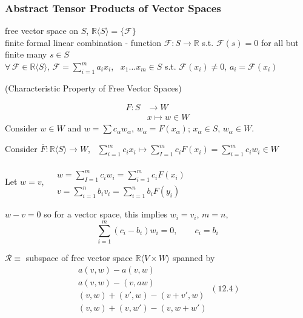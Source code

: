 \subsubsection*{ Abstract Tensor Products of Vector Spaces }



free vector space on $S$, $\mathbb{R}\langle S \rangle = \lbrace \mathcal{F} \rbrace$ \\
\quad \quad finite formal linear combination - function $\mathcal{F} : S \to \mathbb{R}$ s.t. $\mathcal{F}(s) = 0$ for all but finite many $s \in S$ \\
\quad \quad $\forall \, \mathcal{F} \in \mathbb{R} \langle S \rangle$, $\mathcal{F} = \sum_{i=1}^m a_i x_i$, \, $x_1 \dots x_m \in S$ s.t. $\mathcal{F}(x_i) \neq 0$, $a_i = \mathcal{F}(x_i)$

 (Characteristic Property of Free Vector Spaces)

\[
\begin{aligned}
  F : S & \to W \\ 
  & x \mapsto w \in W 
\end{aligned}
\]
Consider $w\in W$ and $w = \sum c_{\alpha} w_{\alpha}$, $w_{\alpha} = F(x_{\alpha})$; $x_{\alpha} \in S$, $w_{\alpha} \in W$.  

Consider $\overline{F}:\mathbb{R}\langle S \rangle \to W$, \, $\sum_{i=1}^m c_i x_i \mapsto \sum_{I=1}^m c_i F(x_i) = \sum_{i=1}^m c_i w_i \in W$

Let $w= v$, $\begin{aligned} & \quad \\ & w = \sum_{I=1}^m c_i w_i = \sum_{i=1}^m c_i F(x_i) \\ & v = \sum_{i=1}^n b_i v_i = \sum_{i=1}^n b_i F(y_i) \end{aligned}$

$w - v =0$ so for a vector space, this implies $w_i = v_i$, $m=n$, 
\[
\sum_{i=1}^m (c_i-b_i)w_i = 0, \quad \quad c_i = b_i
\]

$\mathcal{R} \equiv$ subspace of free vector space $\mathbb{R}\langle V \times W \rangle $ spanned by 
\begin{equation}
\begin{gathered}
  a(v,w) - a(v, w) \\
  a(v,w) - (v,aw) \\
(v,w) + (v',w) - (v+v',w) \\
  (v,w) + (v,w') - (v,w+w')
\end{gathered} (12.4)
\end{equation}

